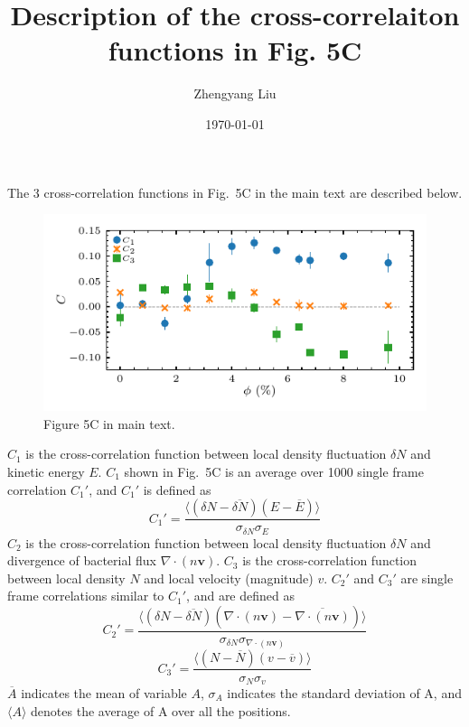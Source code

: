 \documentclass[onecolumn,aps, pre,amsmath,amssymb,longbibliography,11pt]{revtex4-2}
\begin{document}
\title{Description of the cross-correlaiton functions in Fig. 5C}

\author{Zhengyang Liu}
\date{\today}
\maketitle

The 3 cross-correlation functions in Fig.~5C in the main text are described below.

\begin{figure}[h]
  \begin{center}
    \includegraphics[width=5in]{c_divcn_nxv-phi.pdf}
  \end{center}
  \caption[]{Figure 5C in main text.}
  \label{fig:orientation}
\end{figure}



$C_1$ is the cross-correlation function between local density fluctuation $\delta N$ and kinetic energy $E$.
$C_1$ shown in Fig.~5C is an average over 1000 single frame correlation $C_1'$, and $C_1'$ is defined as
\begin{equation}
  C_1' = \frac{ \langle (\delta N-\overline{\delta N})(E-\overline E) \rangle }{\sigma_{\delta N}\sigma_E}
\end{equation}
$C_2$ is the cross-correlation function between local density fluctuation $\delta N$ and divergence of bacterial flux $\nabla\cdot(n\bm{v})$.
$C_3$ is the cross-correlation function between local density $N$ and local velocity (magnitude) $v$.
$C_2'$ and $C_3'$ are single frame correlations similar to $C_1'$, and are defined as
\begin{equation}
  C_2' = \frac{ \langle (\delta N-\overline{\delta N})(\nabla\cdot(n\bm{v})-\overline{\nabla\cdot(n\bm{v})} ) \rangle }{\sigma_{\delta N}\sigma_{\nabla\cdot(n\bm{v})}}
\end{equation}
\begin{equation}
  C_3' = \frac{ \langle (N-\overline N)(v-\overline v) \rangle }{\sigma_N\sigma_v}
\end{equation}
$\overline A$ indicates the mean of variable $A$, $\sigma_A$ indicates the standard deviation of A, and $\langle A \rangle$ denotes the average of A over all the positions.
\end{document}
